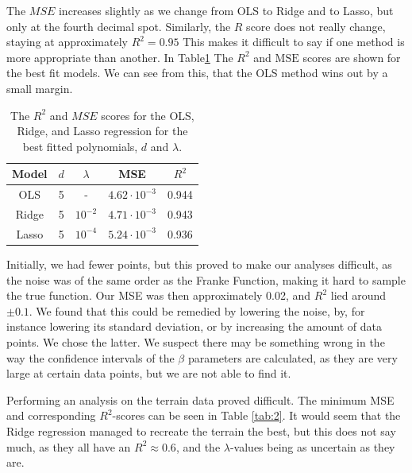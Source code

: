 \documentclass[a4paper,10pt,english]{article}
\begin{document}
The $MSE$ increases slightly as we change from OLS to Ridge and to Lasso, but only at the fourth decimal spot. Similarly, the $R$ score does not really change, staying at approximately $R^2=0.95$ This makes it difficult to say if one method is more appropriate than another.
In Table\ref{tab:1} The $R^2$ and $\mathrm{MSE}$ scores are shown for the best fit models. We can see from this, that the OLS method wins out by a small margin.
\begin{table}[t]
	\centering
	\begin{threeparttable}
		\centering
		\caption{The $R^2$ and $MSE$ scores for the OLS, Ridge, and Lasso regression for the best fitted polynomials, $d$ and $\lambda$.}
		\label{tab:1}
		\begin{tabular}{ccccc}
			\toprule\toprule
			Model & $d$ & $\lambda$ & MSE & $R^2$\\
			\midrule
			OLS			& 5 	& - 	&$4.62\cdot10^{-3}$ & 0.944\\
			Ridge		& 5 	& $10^{-2}$ &$4.71\cdot10^{-3}$ &0.943 \\
			Lasso		& 5 	&$10^{-4}$ & $ 5.24\cdot10^{-3}$ &0.936\\
			\bottomrule\bottomrule
		\end{tabular}
	\end{threeparttable}
\end{table}

Initially, we had fewer points, but this proved to make our analyses difficult, as the noise was of the same order as the Franke Function, making it hard to sample the true function. Our MSE was then approximately 0.02, and $R^2$ lied around $\pm0.1$. 
We found that this could be remedied by lowering the noise, by, for instance lowering its standard deviation, or by increasing the amount of data points. We chose the latter. We suspect there may be something wrong in the way the confidence intervals of the $\beta$ parameters are calculated, as they are very large at certain data points, but we are not able to find it.

Performing an analysis on the terrain data proved difficult. The minimum MSE and corresponding $R^2$-scores can be seen in Table \ref{tab:2}. It would seem that the Ridge regression managed to recreate the terrain the best, but this does not say much, as they all have an $R^2\approx0.6$, and the $\lambda$-values being as uncertain as they are.
\end{document}
